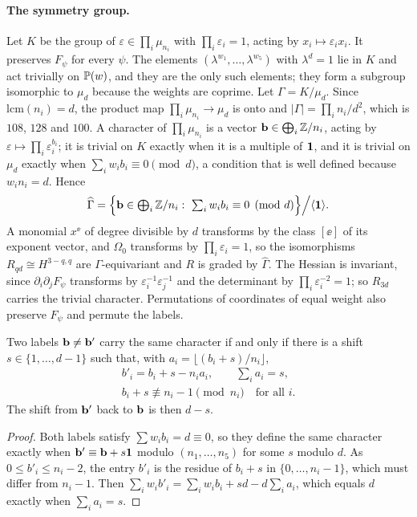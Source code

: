 \paragraph*{The symmetry group.}
Let $K$ be the group of $\varepsilon\in\prod_i\mu_{n_i}$ with
$\prod_i\varepsilon_i=1$, acting by $x_i\mapsto\varepsilon_ix_i$. It
preserves $F_\psi$ for every $\psi$. The elements
$(\lambda^{w_1},\dots,\lambda^{w_5})$ with $\lambda^d=1$ lie in $K$ and act
trivially on $\mathbb{P}(w)$, and they are the only such elements; they form a
subgroup isomorphic to $\mu_d$ because the weights are coprime. Let
$\Gamma=K/\mu_d$. Since $\mathrm{lcm}(n_i)=d$, the product map
$\prod_i\mu_{n_i}\to\mu_d$ is onto and $|\Gamma|=\prod_in_i/d^2$, which is
$108$, $128$ and $100$. A character of $\prod_i\mu_{n_i}$ is a vector
$\mathbf{b}\in\bigoplus_i\mathbb{Z}/n_i$, acting by $\varepsilon\mapsto\prod_i
\varepsilon_i^{b_i}$; it is trivial on $K$ exactly when it is a multiple of
$\mathbf{1}$, and it is trivial on $\mu_d$ exactly when $\sum_iw_ib_i\equiv0
\pmod d$, a condition that is well defined because $w_in_i=d$. Hence
\[
\widehat\Gamma=\Big\{\bb\in\textstyle\bigoplus_i\Z/n_i:\ \sum_iw_ib_i
\equiv0\pmod d\Big\}\Big/\langle\one\rangle .
\]
A monomial $x^{\ee}$ of degree divisible by $d$ transforms by the class
$[\ee]$ of its exponent vector, and $\Omega_0$ transforms by
$\prod_i\varepsilon_i=1$, so the isomorphisms $R_{qd}\cong H^{3-q,q}$ are
$\Gamma$-equivariant and $R$ is graded by $\widehat\Gamma$. The Hessian is
invariant, since $\partial_i\partial_jF_\psi$ transforms by
$\varepsilon_i^{-1}\varepsilon_j^{-1}$ and the determinant by
$\prod_i\varepsilon_i^{-2}=1$; so $R_{3d}$ carries the trivial character.
Permutations of coordinates of equal weight also preserve $F_\psi$ and
permute the labels.

\begin{lemma}[Wrapping]\label{lem:wwrap}
Two labels $\mathbf{b}\ne\mathbf{b}'$ carry the same character if and only if there is a
shift $s\in\{1,\dots,d-1\}$ such that, with $a_i=\lfloor(b_i+s)/n_i\rfloor$,
\[
\begin{gathered}
b'_i=b_i+s-n_ia_i,\qquad \sum_ia_i=s,\\
b_i+s\not\equiv n_i-1\pmod{n_i}\quad\text{for all }i .
\end{gathered}
\]
The shift from $\mathbf{b}'$ back to $\mathbf{b}$ is then $d-s$.
\end{lemma}

\begin{proof}
Both labels satisfy $\sum w_ib_i=d\equiv0$, so they define the same
character exactly when $\mathbf{b}'\equiv\mathbf{b}+s\mathbf{1}$ modulo $(n_1,\dots,n_5)$ for
some $s$ modulo $d$. As $0\le b'_i\le n_i-2$, the entry $b'_i$ is the
residue of $b_i+s$ in $\{0,\dots,n_i-1\}$, which must differ from $n_i-1$.
Then $\sum_iw_ib'_i=\sum_iw_ib_i+sd-d\sum_ia_i$, which equals $d$ exactly
when $\sum_ia_i=s$.
\end{proof}

